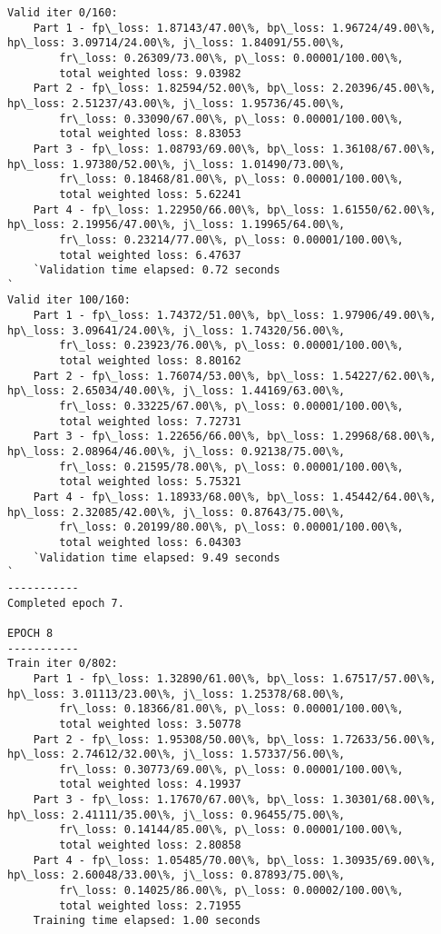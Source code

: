 \documentclass[11pt]{article}
\begin{document}
\begin{Verbatim}[commandchars=\\\{\}]
Valid iter 0/160:
	Part 1 - fp\_loss: 1.87143/47.00\%, bp\_loss: 1.96724/49.00\%, hp\_loss: 3.09714/24.00\%, j\_loss: 1.84091/55.00\%, 
		fr\_loss: 0.26309/73.00\%, p\_loss: 0.00001/100.00\%, 
		total weighted loss: 9.03982
	Part 2 - fp\_loss: 1.82594/52.00\%, bp\_loss: 2.20396/45.00\%, hp\_loss: 2.51237/43.00\%, j\_loss: 1.95736/45.00\%, 
		fr\_loss: 0.33090/67.00\%, p\_loss: 0.00001/100.00\%, 
		total weighted loss: 8.83053
	Part 3 - fp\_loss: 1.08793/69.00\%, bp\_loss: 1.36108/67.00\%, hp\_loss: 1.97380/52.00\%, j\_loss: 1.01490/73.00\%, 
		fr\_loss: 0.18468/81.00\%, p\_loss: 0.00001/100.00\%, 
		total weighted loss: 5.62241
	Part 4 - fp\_loss: 1.22950/66.00\%, bp\_loss: 1.61550/62.00\%, hp\_loss: 2.19956/47.00\%, j\_loss: 1.19965/64.00\%, 
		fr\_loss: 0.23214/77.00\%, p\_loss: 0.00001/100.00\%, 
		total weighted loss: 6.47637
	`Validation time elapsed: 0.72 seconds
`
Valid iter 100/160:
	Part 1 - fp\_loss: 1.74372/51.00\%, bp\_loss: 1.97906/49.00\%, hp\_loss: 3.09641/24.00\%, j\_loss: 1.74320/56.00\%, 
		fr\_loss: 0.23923/76.00\%, p\_loss: 0.00001/100.00\%, 
		total weighted loss: 8.80162
	Part 2 - fp\_loss: 1.76074/53.00\%, bp\_loss: 1.54227/62.00\%, hp\_loss: 2.65034/40.00\%, j\_loss: 1.44169/63.00\%, 
		fr\_loss: 0.33225/67.00\%, p\_loss: 0.00001/100.00\%, 
		total weighted loss: 7.72731
	Part 3 - fp\_loss: 1.22656/66.00\%, bp\_loss: 1.29968/68.00\%, hp\_loss: 2.08964/46.00\%, j\_loss: 0.92138/75.00\%, 
		fr\_loss: 0.21595/78.00\%, p\_loss: 0.00001/100.00\%, 
		total weighted loss: 5.75321
	Part 4 - fp\_loss: 1.18933/68.00\%, bp\_loss: 1.45442/64.00\%, hp\_loss: 2.32085/42.00\%, j\_loss: 0.87643/75.00\%, 
		fr\_loss: 0.20199/80.00\%, p\_loss: 0.00001/100.00\%, 
		total weighted loss: 6.04303
	`Validation time elapsed: 9.49 seconds
`
-----------
Completed epoch 7.

EPOCH 8
-----------
Train iter 0/802:
	Part 1 - fp\_loss: 1.32890/61.00\%, bp\_loss: 1.67517/57.00\%, hp\_loss: 3.01113/23.00\%, j\_loss: 1.25378/68.00\%, 
		fr\_loss: 0.18366/81.00\%, p\_loss: 0.00001/100.00\%, 
		total weighted loss: 3.50778
	Part 2 - fp\_loss: 1.95308/50.00\%, bp\_loss: 1.72633/56.00\%, hp\_loss: 2.74612/32.00\%, j\_loss: 1.57337/56.00\%, 
		fr\_loss: 0.30773/69.00\%, p\_loss: 0.00001/100.00\%, 
		total weighted loss: 4.19937
	Part 3 - fp\_loss: 1.17670/67.00\%, bp\_loss: 1.30301/68.00\%, hp\_loss: 2.41111/35.00\%, j\_loss: 0.96455/75.00\%, 
		fr\_loss: 0.14144/85.00\%, p\_loss: 0.00001/100.00\%, 
		total weighted loss: 2.80858
	Part 4 - fp\_loss: 1.05485/70.00\%, bp\_loss: 1.30935/69.00\%, hp\_loss: 2.60048/33.00\%, j\_loss: 0.87893/75.00\%, 
		fr\_loss: 0.14025/86.00\%, p\_loss: 0.00002/100.00\%, 
		total weighted loss: 2.71955
	Training time elapsed: 1.00 seconds


\end{Verbatim}
\end{document}
